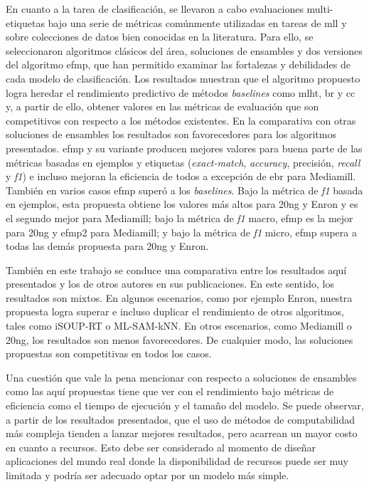 En cuanto a la tarea de clasificación, se llevaron a cabo evaluaciones
multi-etiquetas bajo una serie de métricas comúnmente utilizadas en tareas de
\acrshort{mll} y sobre colecciones de datos bien conocidas en la literatura.
Para ello, se seleccionaron algoritmos clásicos del área, soluciones de
ensambles y dos versiones del algoritmo \acrshort{efmp}, que han permitido
examinar las fortalezas y debilidades de cada modelo de clasificación. Los
resultados muestran que el algoritmo propuesto logra heredar el rendimiento
predictivo de métodos \textit{baselines} como \acrshort{mlht}, \acrshort{br} y
\acrshort{cc} y, a partir de ello, obtener valores en las métricas de evaluación
que son competitivos con respecto a los métodos existentes. En la comparativa
con otras soluciones de ensambles los resultados son favorecedores para los
algoritmos presentados. \acrshort{efmp} y su variante producen mejores valores
para buena parte de las métricas basadas en ejemplos y etiquetas
(\textit{exact-match}, \textit{accuracy}, precisión, \textit{recall} y
\textit{f1}) e incluso mejoran la eficiencia de todos a excepción de
\acrshort{ebr} para Mediamill. También en varios casos \acrshort{efmp} superó a
los \textit{baselines}. Bajo la métrica de \textit{f1} basada en ejemplos, esta
propuesta obtiene los valores más altos para 20ng y Enron y es el segundo mejor
para Mediamill; bajo la métrica de \textit{f1} macro, \acrshort{efmp} es la
mejor para 20ng y \acrshort{efmp2} para Mediamill; y bajo la métrica de
\textit{f1} micro, \acrshort{efmp} supera a todas las demás propuesta para 20ng
y Enron.

También en este trabajo se conduce una comparativa entre los resultados aquí
presentados y los de otros autores en sus publicaciones. En este sentido, los
resultados son mixtos. En algunos escenarios, como por ejemplo Enron, nuestra
propuesta logra superar e incluso duplicar el rendimiento de otros algoritmos,
tales como iSOUP-RT o ML-SAM-kNN\@. En otros escenarios, como Mediamill o 20ng,
los resultados son menos favorecedores. De cualquier modo, las soluciones
propuestas son competitivas en todos los casos.

Una cuestión que vale la pena mencionar con respecto a soluciones de ensambles
como las aquí propuestas tiene que ver con el rendimiento bajo métricas de
eficiencia como el tiempo de ejecución y el tamaño del modelo. Se puede
observar, a partir de los resultados presentados, que el uso de métodos de
computabilidad más compleja tienden a lanzar mejores resultados, pero acarrean
un mayor costo en cuanto a recursos. Esto debe ser considerado al momento de
diseñar aplicaciones del mundo real donde la disponibilidad de recursos puede
ser muy limitada y podría ser adecuado optar por un modelo más simple.

